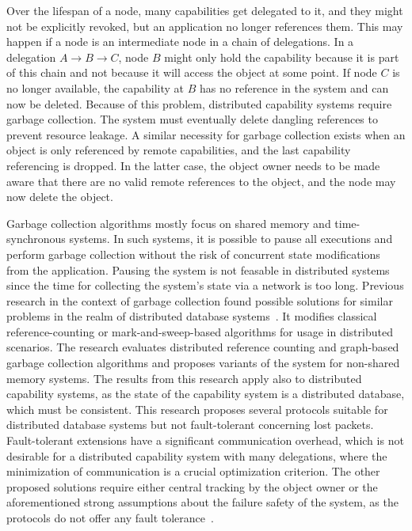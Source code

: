 Over the lifespan of a node, many capabilities get delegated to it, and they might not be explicitly revoked, but an application no longer references them. This may happen if a node is an intermediate node in a chain of delegations. In a delegation $A \to B \to C$, node $B$ might only hold the capability because it is part of this chain and not because it will access the object at some point. If node $C$ is no longer available, the capability at $B$ has no reference in the system and can now be deleted. Because of this problem, distributed capability systems require garbage collection. The system must eventually delete dangling references to prevent resource leakage. A similar necessity for garbage collection exists when an object is only referenced by remote capabilities, and the last capability referencing is dropped. In the latter case, the object owner needs to be made aware that there are no valid remote references to the object, and the node may now delete the object.

Garbage collection algorithms mostly focus on shared memory and time-synchronous systems. In such systems, it is possible to pause all executions and perform garbage collection without the risk of concurrent state modifications from the application. Pausing the system is not feasable in distributed systems since the time for collecting the system's state via a network is too long.
Previous research in the context of garbage collection found possible solutions for similar problems in the realm of distributed database systems~\cite {plainfosseSurveyDistributedGarbage1995, shapiroGarbageDetectionProtocol}\@. It modifies classical reference-counting or mark-and-sweep-based algorithms for usage in distributed scenarios. The research evaluates distributed reference counting and graph-based garbage collection algorithms and proposes variants of the system for non-shared memory systems. The results from this research apply also to distributed capability systems, as the state of the capability system is a distributed database, which must be consistent. This research proposes several protocols suitable for distributed database systems but not fault-tolerant concerning lost packets. Fault-tolerant extensions have a significant communication overhead, which is not desirable for a distributed capability system with many delegations, where the minimization of communication is a crucial optimization criterion. The other proposed solutions require either central tracking by the object owner or the aforementioned strong assumptions about the failure safety of the system, as the protocols do not offer any fault tolerance~\cite{shapiroSSPChainsRobust1992}\@.

